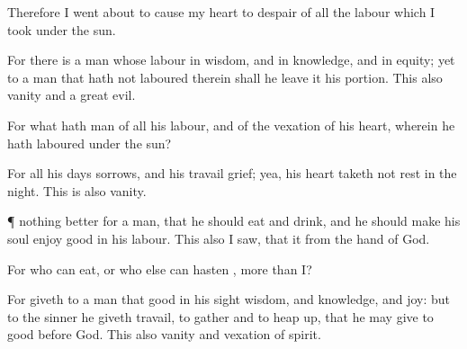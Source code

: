 {Therefore I went
about to
cause my
heart to
despair of all the
labour which I
took under the
sun.

For there
is a
man whose
labour
{} in
wisdom, and in
knowledge, and in
equity; yet to a
man that hath not
laboured therein shall he
leave it
{} his
portion. This also
{}
vanity and a
great
evil.

For what
hath
man of all his
labour, and of the
vexation of his
heart,
wherein he hath
laboured under the
sun?

For all his
days
{}
sorrows, and his
travail
grief; yea, his
heart taketh not
rest in the
night. This is also
vanity.


\par }{\PP {}¶
{} nothing
better for a
man,
{} that he should
eat and
drink, and
{} he should make his
soul
enjoy
good in his
labour.
This also I
saw, that it
{} from the
hand of
God.

For who can
eat, or who else can
hasten
{},
more than I?

For
{}
giveth to a
man that
{}
good in his
sight
wisdom, and
knowledge, and
joy: but to the
sinner he
giveth
travail, to
gather and to heap
up, that he may
give to
{}
good
before
God. This also
{}
vanity and
vexation of
spirit.




\par }
